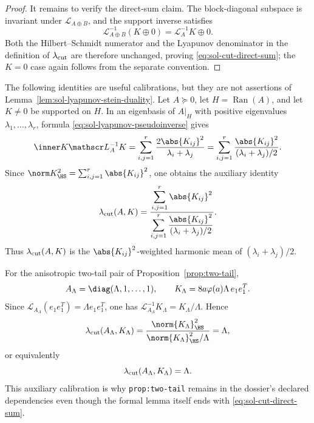 \documentclass[../main.tex]{subfiles}
\begin{document}
\begin{proof}
It remains to verify the direct-sum claim.
The block-diagonal subspace is invariant under $\mathscr L_{A\oplus B}$, and the support
inverse satisfies
\[
 \mathscr L_{A\oplus B}^{-1}(K\oplus0)
 =\mathscr L_A^{-1}K\oplus0.
\]
Both the Hilbert--Schmidt numerator and the Lyapunov denominator in the definition of
$\lambda_{\rm cut}$ are therefore unchanged, proving \eqref{eq:sol-cut-direct-sum}; the
$K=0$ case again follows from the separate convention.
\end{proof}

\begin{remark}
\label{rem:sol-cut-scale-calibration}
The following identities are useful calibrations, but they are not assertions of
Lemma~\ref{lem:sol-lyapunov-stein-duality}.  Let $A\succeq0$, let
$H=\operatorname{Ran}(A)$, and let $K\ne0$ be supported on $H$.  In an eigenbasis of
$A|_H$ with positive eigenvalues $\lambda_1,\ldots,\lambda_r$, formula
\eqref{eq:sol-lyapunov-pseudoinverse} gives
\[
 \inner K{\mathscr L_A^{-1}K}
 =\sum_{i,j=1}^r\frac{2\abs{K_{ij}}^2}{\lambda_i+\lambda_j}
 =\sum_{i,j=1}^r
   \frac{\abs{K_{ij}}^2}{(\lambda_i+\lambda_j)/2}.
\]
Since $\norm K_{\HS}^2=\sum_{i,j=1}^r\abs{K_{ij}}^2$, one obtains the auxiliary identity
\begin{equation}\label{eq:sol-cut-harmonic-mean}
 \lambda_{\rm cut}(A,K)
 =\frac{\displaystyle\sum_{i,j=1}^r\abs{K_{ij}}^2}
 {\displaystyle\sum_{i,j=1}^r
   \frac{\abs{K_{ij}}^2}{(\lambda_i+\lambda_j)/2}}.
\end{equation}
Thus $\lambda_{\rm cut}(A,K)$ is the $\abs{K_{ij}}^2$-weighted harmonic mean of
$(\lambda_i+\lambda_j)/2$.

For the anisotropic two-tail pair of Proposition~\ref{prop:two-tail},
\[
 A_\Lambda=\diag(\Lambda,1,\ldots,1),
 \qquad
 K_\Lambda=8a\varphi(a)\Lambda\,e_1e_1^T.
\]
Since
$\mathscr L_{A_\Lambda}(e_1e_1^T)=\Lambda e_1e_1^T$, one has
$\mathscr L_{A_\Lambda}^{-1}K_\Lambda=K_\Lambda/\Lambda$.  Hence
\[
 \lambda_{\rm cut}(A_\Lambda,K_\Lambda)
 =\frac{\norm{K_\Lambda}_{\HS}^2}
 {\norm{K_\Lambda}_{\HS}^2/\Lambda}
 =\Lambda,
\]
or equivalently
\begin{equation}\label{eq:sol-cut-two-tail}
 \lambda_{\rm cut}(A_\Lambda,K_\Lambda)=\Lambda.
\end{equation}
This auxiliary calibration is why \texttt{prop:two-tail} remains in the dossier's declared
dependencies even though the formal lemma itself ends with
\eqref{eq:sol-cut-direct-sum}.
\end{remark}
\end{document}
